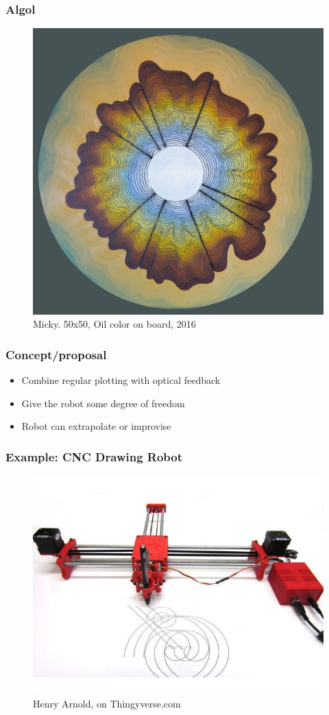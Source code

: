 \documentclass[12pt]{beamer}
\begin{document}
\begin{frame}[c]\frametitle{Algol}
\begin{figure}
  \centering
  \includegraphics[width=.6\textwidth]{images/algol.jpg}
  \caption{Micky. 50x50, Oil color on board, 2016}
\end{figure}
\end{frame}

\begin{frame}[c]\frametitle{Concept/proposal}
\large
\begin{itemize}
  \item Combine regular plotting with optical feedback
  \item Give the robot some degree of freedom %
  \item Robot can extrapolate or improvise %
\end{itemize}



\end{frame}

\begin{frame}[c]\frametitle{Example: CNC Drawing Robot}
\begin{figure}
  \centering
  \includegraphics[width=.7\textwidth]{images/drawingrobot1.jpg}
  \caption{Henry Arnold, on Thingyverse.com}
\end{figure}
\end{frame}
\end{document}
